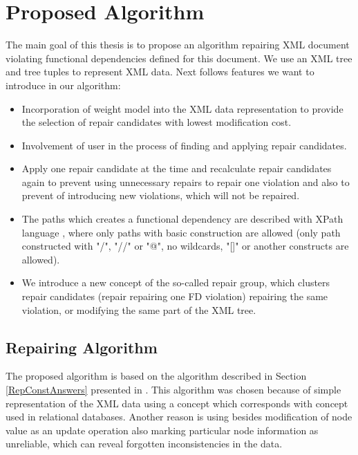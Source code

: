 \chapter{Proposed Algorithm}\label{kap4}

The main goal of this thesis is to propose an algorithm repairing XML document violating functional dependencies defined for this document. We use an XML tree and tree tuples to represent XML data. Next follows features we want to introduce in our algorithm:

\begin{itemize}
	\item Incorporation of weight model into the XML data representation to provide the selection of repair candidates with lowest modification cost.
    \item Involvement of user in the process of finding and applying repair candidates.
    \item Apply one repair candidate at the time and recalculate repair candidates again to prevent using unnecessary repairs to repair one violation and also to prevent of introducing new violations, which will not be repaired.
    \item The paths which creates a functional dependency are described with XPath language \cite{xpath}, where only paths with basic construction are allowed (only path constructed with "/", "//" or "@", no wildcards, "[]" or another constructs are allowed).
    \item We introduce a new concept of the so-called repair group, which clusters repair candidates (repair repairing one FD violation) repairing the same violation, or modifying the same part of the XML tree.
\end{itemize}


\section{Repairing Algorithm}

The proposed algorithm is based on the algorithm described in Section \ref{RepConstAnswers} presented in \cite{RepAndConsistentAnswer}. This algorithm was chosen because of simple representation of the XML data using a concept which corresponds with concept used in relational databases. Another reason is using besides modification of node value as an update operation also marking particular node information as unreliable, which can reveal forgotten inconsistencies in the data.

